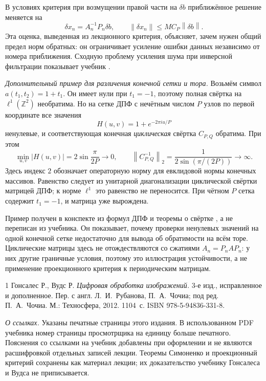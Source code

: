 \documentclass[12pt,a4paper]{article}
\theoremstyle{definition}
\theoremstyle{remark}
\newcommand{\ZZ}{\mathbb{Z}}
\newcommand{\norm}[1]{\left\lVert #1\right\rVert}
\begin{document}
В условиях критерия при возмущении правой части на $\delta b$
приближённое решение меняется на
\[
  \delta x_n=A_n^{-1}P_n\delta b,\qquad
  \norm{\delta x_n}\leqslant MC_P\norm{\delta b}.
\]
Эта оценка, выведенная из лекционного критерия, объясняет,
зачем нужен общий предел норм обратных: он ограничивает усиление
ошибки данных независимо от номера приближения. Сходную проблему
усиления шума при инверсной фильтрации показывает учебник
\cite[\S\,5.7, с.~412]{GW2012}.

\emph{Дополнительный пример для различения конечной сетки и тора.}
Возьмём символ $a(t_1,t_2)=1+t_1$. Он имеет нули при $t_1=-1$,
поэтому полная свёртка на $\ell^1(\ZZ^2)$ необратима.
Но на сетке ДПФ с нечётным числом $P$ узлов по первой координате
все значения
\[
  H(u,v)=1+e^{-2\pi i u/P}
\]
ненулевые, и соответствующая конечная \emph{циклическая} свёртка
$C_{P,Q}$ обратима. При этом
\[
  \min_{u,v}|H(u,v)|=2\sin\frac{\pi}{2P}\longrightarrow0,
  \qquad
  \norm{C_{P,Q}^{-1}}_2
  =\frac{1}{2\sin(\pi/(2P))}\longrightarrow\infty.
\]
Здесь индекс $2$ обозначает операторную норму для евклидовой
нормы конечных массивов. Равенство следует из унитарной
диагонализации циклической свёртки матрицей ДПФ; к норме
$\ell^1$ это равенство не переносится. При чётном $P$ сетка
содержит $t_1=-1$, и матрица уже вырождена.

Пример получен в конспекте из формул ДПФ и теоремы о свёртке
\cite[\S\,4.5.5, с.~284; \S\,4.6.6, с.~298]{GW2012},
а не переписан из учебника. Он показывает, почему проверки
ненулевых значений на одной конечной сетке недостаточно для
вывода об обратимости на всём торе. Циклические матрицы здесь
не отождествляются со сжатиями $A_n=P_nAP_n$: у них другие
граничные условия, поэтому это иллюстрация устойчивости,
а не применение проекционного критерия к периодическим матрицам.

\begin{thebibliography}{1}
Гонсалес Р., Вудс Р.
\emph{Цифровая обработка изображений.}
3-е изд., исправленное и дополненное.
Пер. с англ. Л.~И.~Рубанова, П.~А.~Чочиа;
под ред. П.~А.~Чочиа. М.: Техносфера, 2012. 1104~с.
ISBN 978-5-94836-331-8.
\end{thebibliography}

\noindent\emph{О ссылках.} Указаны печатные страницы этого издания.
В использованном PDF учебника номер страницы
просмотрщика на единицу больше печатного. Пояснения со ссылками
на учебник добавлены при оформлении и не являются расшифровкой
отдельных записей лекции. Теоремы Симоненко и проекционный критерий
сохранены как материал лекции; их доказательство учебнику
Гонсалеса и Вудса не приписывается.
\end{document}
